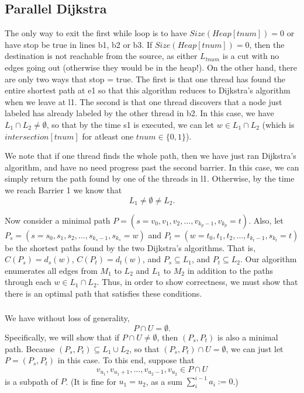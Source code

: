 \documentclass{article}
\begin{document}
\subsection{Parallel Dijkstra}


The only way to exit the first while loop is to have $Size(Heap[tnum]) = 0$ or have stop be true in lines b1, b2 or b3.
If $Size(Heap[tnum]) = 0$, then the destination is not reachable from the source, as either $L_{tnum}$ is a cut with no edges going out (otherwise they would be in the heap!).
On the other hand, there are only two ways that stop = true.
The first is that one thread has found the entire shortest path at e1 so that this algorithm reduces to Dijkstra's algorithm when we leave at l1.
The second is that one thread discovers that a node just labeled has already labeled by the other thread in b2.
In this case, we have $L_1 \cap L_2 \ne \emptyset$, so that by the time s1 is executed, we can let $w \in L_1 \cap L_2$ (which is $intersection[tnum]$ for atleast one $tnum \in \{0,1\}$).

We note that if one thread finds the whole path, then we have just ran Dijkstra's algorithm, and have no need progress past the second barrier.
In this case, we can simply return the path found by one of the threads in l1.
Otherwise, by the time we reach Barrier 1 we know that 
$$ L_1 \ne \emptyset \ne L_2.$$


Now consider a minimal path $P = (s = v_0, v_1, v_2, \ldots, v_{k_p-1}, v_{k_p} = t)$.
Also, let $P_s = (s = s_0, s_1, s_2, \ldots, s_{k_s-1}, s_{k_s} = w)$ and
$P_t = (w = t_0, t_1, t_2, \ldots, t_{k_t-1}, s_{k_t} = t)$ be the shortest paths found by the two Dijkstra's algorithms.
That is, $C(P_s) = d_s(w)$, $C(P_t) = d_t(w)$, and $P_s \subseteq L_1$, and $P_t \subseteq L_2$.
Our algorithm enumerates all edges from $M_1$ to $L_2$ and $L_1$ to $M_2$ in addition to the paths through each $w \in L_1 \cap L_2$.
Thus, in order to show correctness, we must show that there is an optimal path that satisfies these conditions.


\subsubsection{}
We have without loss of generality, 
\begin{equation}
P \cap U = \emptyset.
\label{eq:nullintersect}
\end{equation}
Specifically, we will show that if $P \cap U \ne \emptyset$, then $(P_s, P_t)$ is also a minimal path.
Because $(P_s, P_t) \subseteq L_1 \cup L_2$, so that $(P_s, P_t) \cap U = \emptyset$, we can just let $P=(P_s, P_t)$ in this case.
To this end, suppose that $$v_{u_1},v_{u_1+1},\ldots,v_{u_2-1},v_{u_2} \in P \cap U$$
is a subpath of $P$. (It is fine for $u_1=u_2$, as a sum $\sum_{i}^{i-1} a_i := 0$.)
\end{document}
